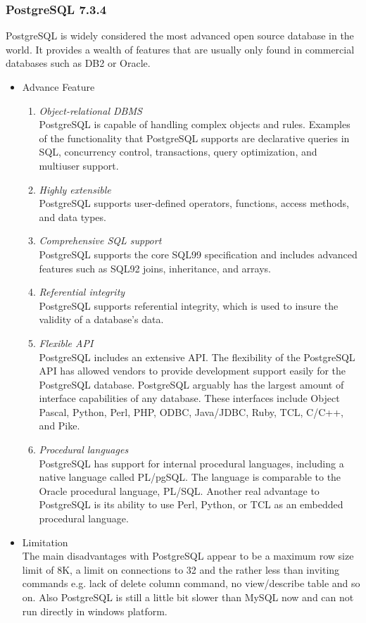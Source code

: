 \documentclass[11pt]{article}
\begin{document}
\begin{itemize}
\end{itemize}

\subsubsection{PostgreSQL 7.3.4}
PostgreSQL is widely considered the most advanced open source database in the world. It provides a wealth of features that are usually only found in commercial databases such as DB2 or Oracle. 

\begin{itemize}
\item Advance Feature
\begin{enumerate}
\item \emph{Object-relational DBMS}\\
PostgreSQL is capable of handling complex objects and rules. Examples of the functionality that PostgreSQL supports are declarative queries in SQL, concurrency control, transactions, query optimization, and multiuser support.
\item \emph{Highly extensible}\\
PostgreSQL supports user-defined operators, functions, access methods, and data types.
\item \emph{Comprehensive SQL support}\\
PostgreSQL supports the core SQL99 specification and includes advanced features such as SQL92 joins, inheritance, and arrays.
\item \emph{Referential integrity}\\
PostgreSQL supports referential integrity, which is used to insure the validity of a database's data.
\item \emph{Flexible API}\\
PostgreSQL includes an extensive API. The flexibility of the PostgreSQL API has allowed vendors to provide development support easily for the PostgreSQL database. PostgreSQL arguably has the largest amount of interface capabilities of any database. These interfaces include Object Pascal, Python, Perl, PHP, ODBC, Java/JDBC, Ruby, TCL, C/C++, and Pike.
\item \emph{Procedural languages}\\
PostgreSQL has support for internal procedural languages, including a native language called PL/pgSQL. The language is comparable to the Oracle procedural language, PL/SQL. Another real advantage to PostgreSQL is its ability to use Perl, Python, or TCL as an embedded procedural language.
\end {enumerate}
\item Limitation\\
The main disadvantages with PostgreSQL appear to be a maximum row size limit of 8K, a limit on connections to 32 and the rather less than inviting commands e.g. lack of delete column command, no view/describe table and so on. Also PostgreSQL is still a little bit slower than MySQL now and can not run directly in windows platform.
\end{itemize}
\end{document}
